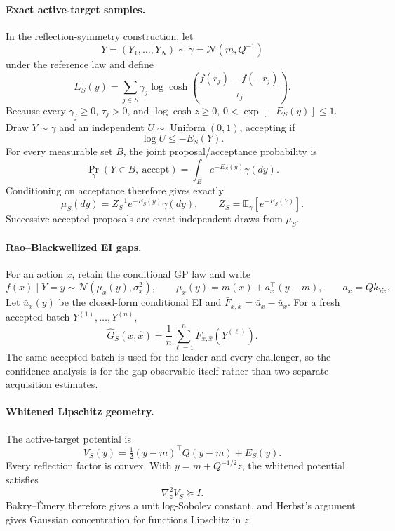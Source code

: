 \paragraph{Exact active-target samples.}
In the reflection-symmetry construction, let
\[
  Y=(Y_1,\ldots,Y_N)\sim\gamma=\mathcal N(m,Q^{-1})
\]
under the reference law and define
\[
  E_S(y)=\sum_{j\in S}\gamma_j
  \log\cosh\!\left(\frac{f(r_j)-f(-r_j)}{\tau_j}\right).
\]
Because every $\gamma_j\ge0$, $\tau_j>0$, and $\log\cosh z\ge0$,
$0<\exp[-E_S(y)]\le1$.  Draw $Y\sim\gamma$ and an independent
$U\sim\operatorname{Uniform}(0,1)$, accepting if
\begin{equation}
  \log U\le-E_S(Y).
  \label{eq:symmetry-rejection-rule}
\end{equation}
For every measurable set $B$, the joint proposal/acceptance probability is
\[
  \Pr_\gamma(Y\in B,\ \mathrm{accept})
  =\int_B e^{-E_S(y)}\gamma(dy).
\]
Conditioning on acceptance therefore gives exactly
\[
  \mu_S(dy)=Z_S^{-1}e^{-E_S(y)}\gamma(dy),
  \qquad Z_S=\mathbb E_\gamma[e^{-E_S(Y)}].
\]
Successive accepted proposals are exact independent draws from $\mu_S$.

\paragraph{Rao--Blackwellized EI gaps.}
For an action $x$, retain the conditional GP law and write
\[
  f(x)\mid Y=y\sim\mathcal N(\mu_x(y),\sigma_x^2),
  \qquad
  \mu_x(y)=m(x)+a_x^\top(y-m),
  \qquad a_x=Qk_{Yx}.
\]
Let $\bar u_x(y)$ be the closed-form conditional EI and
$\bar F_{x,\widehat x}=\bar u_x-\bar u_{\widehat x}$.  For a fresh accepted
batch $Y^{(1)},\ldots,Y^{(n)}$,
\begin{equation}
  \widehat G_S(x,\widehat x)
  =\frac1n\sum_{\ell=1}^n
   \bar F_{x,\widehat x}(Y^{(\ell)}).
  \label{eq:rb-ei-gap-mean}
\end{equation}
The same accepted batch is used for the leader and every challenger, so the
confidence analysis is for the gap observable itself rather than two separate
acquisition estimates.

\paragraph{Whitened Lipschitz geometry.}
The active-target potential is
\[
  V_S(y)=\tfrac12(y-m)^\top Q(y-m)+E_S(y).
\]
Every reflection factor is convex.  With $y=m+Q^{-1/2}z$, the whitened
potential satisfies
\[
  \nabla_z^2 V_S\succeq I.
\]
Bakry--\'Emery therefore gives a unit log-Sobolev constant, and Herbst's
argument gives Gaussian concentration for functions Lipschitz in $z$.

